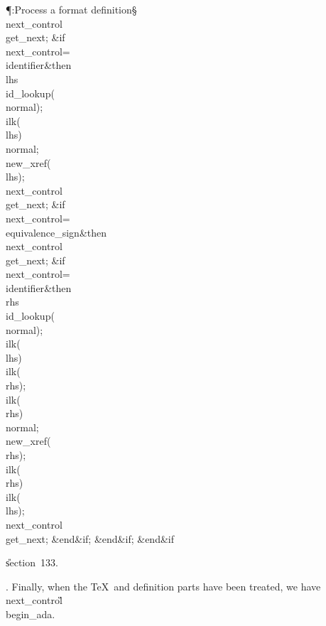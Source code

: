 \Y\P\?\4:Process a format definition\X\S\?\6
\\{next\_control}\?\K\?\\{get\_next};\6
\&{if}\1\1\8\\{next\_control}\?=\?\\{identifier}\2\8\&{then}\6
\\{lhs}\?\K\?\\{id\_lookup}\?\1(\?\\{normal}\?\2)\?;\5
\\{ilk}\?\1(\?\\{lhs}\?\2)\K\?\\{normal};\5
\\{new\_xref}\?\1(\?\\{lhs}\?\2)\?;\5
\\{next\_control}\?\K\?\\{get\_next};\6
\&{if}\1\1\8\\{next\_control}\?=\?\\{equivalence\_sign}\2\8\&{then}\6
\\{next\_control}\?\K\?\\{get\_next};\6
\&{if}\1\1\8\\{next\_control}\?=\?\\{identifier}\2\8\&{then}\6
\\{rhs}\?\K\?\\{id\_lookup}\?\1(\?\\{normal}\?\2)\?;\5
\\{ilk}\?\1(\?\\{lhs}\?\2)\K\?\\{ilk}\?\1(\?\\{rhs}\?\2)\?;\5
\\{ilk}\?\1(\?\\{rhs}\?\2)\K\?\\{normal};\5
\\{new\_xref}\?\1(\?\\{rhs}\?\2)\?;\5
\\{ilk}\?\1(\?\\{rhs}\?\2)\K\?\\{ilk}\?\1(\?\\{lhs}\?\2)\?;\5
\\{next\_control}\?\K\?\\{get\_next};\2\6
\&{end}\8\2\&{if}\1;\2\6
\&{end}\8\2\&{if}\1;\2\6
\&{end}\8\2\&{if}\1\par
\U section~133.\fi

. Finally, when the \TeX\ and definition parts have been treated, we have
\\{next\_control}\?\G\?\\{begin\_ada}.

